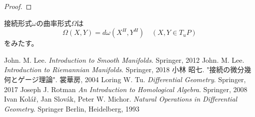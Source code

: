 \documentclass[report]{jlreq}
\begin{document}
\begin{proof}
    \TODO{}
\end{proof}

\begin{proposition}
    接続形式$\omega$の曲率形式$\Omega$は
    \begin{equation}
        \Omega(X, Y) = d\omega(X^H, Y^H)
            \quad
            (X, Y \in T_uP)
    \end{equation}
    をみたす。
\end{proposition}


\newpage
{}
{}
\renewcommand{\bibname}{参考文献}
\markboth{\bibname}{}
\begin{thebibliography}{9}
        John. M. Lee.
        \textit{Introduction to Smooth Manifolds}.
        Springer,
        2012
        John. M. Lee.
        \textit{Introduction to Riemannian Manifolds}.
        Springer,
        2018
     小林 昭七. "接続の微分幾何とゲージ理論". 裳華房, 2004
        Loring W. Tu.
        \textit{Differential Geometry}.
        Springer,
        2017
     Joseph J. Rotman \textit{An Introduction to Homological Algebra}. Springer, 2008
        Ivan Kolář, Jan Slovák, Peter W. Michor.
        \textit{Natural Operations in Differential Geometry}.
        Springer Berlin, Heidelberg,
        1993
\end{thebibliography}
\end{document}
